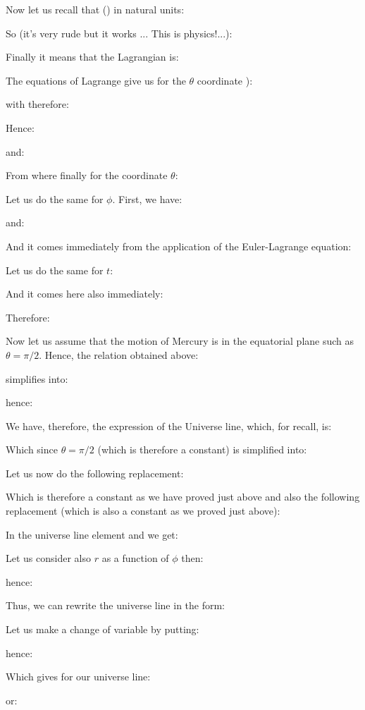	Now let us recall that () in natural units:
	
	So (it's very rude but it works ... This is physics!...):
	
	Finally it means that the Lagrangian is:
	
	The equations of Lagrange give us for the $\theta$ coordinate ):
	
	with therefore:
	
	Hence:
	
	and:
	
	From where finally for the coordinate $\theta$:
	
	Let us do the same for $\phi$. First, we have:
	
	and:
	
	And it comes immediately from the application of the Euler-Lagrange equation:
	
	Let us do the same for $t$:
	
	And it comes here also immediately:
	
	Therefore:
	
	Now let us assume that the motion of Mercury is in the equatorial plane such as $\theta=\pi/2$. Hence, the relation obtained above:
	
	simplifies into:
	
	hence:
	
	We have, therefore, the expression of the Universe line, which, for recall, is:
	
	Which since $\theta=\pi/2$ (which is therefore a constant) is simplified into:
	
	Let us now do the following replacement:
	
	Which is therefore a constant as we have proved just above and also the following replacement (which is also a constant as we proved just above):
	
	In the universe line element and we get:
	
	Let us consider also $r$ as a function of $\phi$ then:
	
	hence:
	
	Thus, we can rewrite the universe line in the form:
	
	Let us make a change of variable by putting:
	
	hence:
	
	Which gives for our universe line:
	
	or:
	
